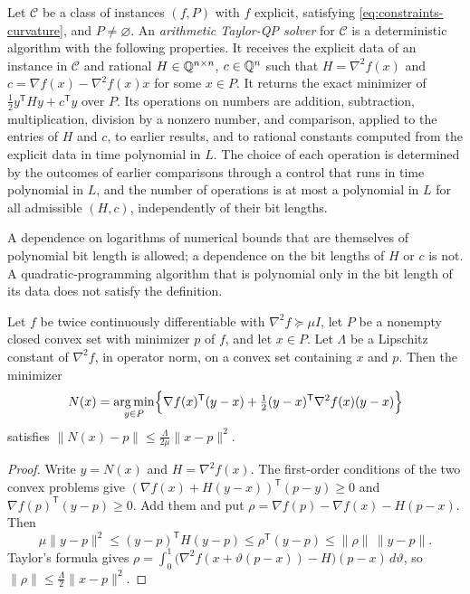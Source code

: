 \begin{definition}
\label{def:constraints-qp-solver}
Let $\mathcal C$ be a class of instances $(f,P)$ with $f$ explicit,
satisfying \eqref{eq:constraints-curvature}, and $P\ne\varnothing$. An
\emph{arithmetic Taylor-QP solver} for $\mathcal C$ is a deterministic
algorithm with the following properties. It receives the explicit data of an
instance in $\mathcal C$ and rational $H\in\mathbb Q^{n\times n}$, $c\in\mathbb Q^n$ such
that $H=\nabla^2f(x)$ and $c=\nabla f(x)-\nabla^2f(x)x$ for some $x\in P$. It
returns the exact minimizer of $\tfrac12y^{\mathsf T}Hy+c^{\mathsf T}y$ over
$P$. Its operations on numbers are addition, subtraction, multiplication,
division by a nonzero number, and comparison, applied to the entries of $H$
and $c$, to earlier results, and to rational constants computed from the
explicit data in time polynomial in $L$. The choice of each operation is
determined by the outcomes of earlier comparisons through a control that runs
in time polynomial in $L$, and the number of operations is at most a
polynomial in $L$ for all admissible $(H,c)$, independently of their bit
lengths.
\end{definition}

A dependence on logarithms of numerical bounds that are themselves of
polynomial bit length is allowed; a dependence on the bit lengths of $H$ or
$c$ is not. A quadratic-programming algorithm that is polynomial only in the
bit length of its data does not satisfy the definition.

\begin{lemma}
\label{lem:constraints-newton-step}
Let $f$ be twice continuously differentiable with $\nabla^2f\succeq\mu I$, let
$P$ be a nonempty closed convex set with minimizer $p$ of $f$, and let $x\in P$.
Let $\Lambda$ be a Lipschitz constant of $\nabla^2f$, in operator norm, on a
convex set containing $x$ and $p$. Then the minimizer
\[
 N(x)=\operatorname*{arg\,min}_{y\in P}\Bigl\{\nabla f(x)^{\mathsf T}(y-x)
 +\tfrac12(y-x)^{\mathsf T}\nabla^2f(x)(y-x)\Bigr\}
\]
satisfies $\|N(x)-p\|\le\frac{\Lambda}{2\mu}\|x-p\|^2$.
\end{lemma}

\begin{proof}
Write $y=N(x)$ and $H=\nabla^2f(x)$. The first-order conditions of the two
convex problems give
$(\nabla f(x)+H(y-x))^{\mathsf T}(p-y)\ge0$ and
$\nabla f(p)^{\mathsf T}(y-p)\ge0$. Add them and put
$\rho=\nabla f(p)-\nabla f(x)-H(p-x)$. Then
\[
 \mu\|y-p\|^2\le(y-p)^{\mathsf T}H(y-p)\le\rho^{\mathsf T}(y-p)
 \le\|\rho\|\,\|y-p\|.
\]
Taylor's formula gives
$\rho=\int_0^1\bigl(\nabla^2f(x+\vartheta(p-x))-H\bigr)(p-x)\,d\vartheta$, so
$\|\rho\|\le\frac\Lambda2\|x-p\|^2$.
\end{proof}

